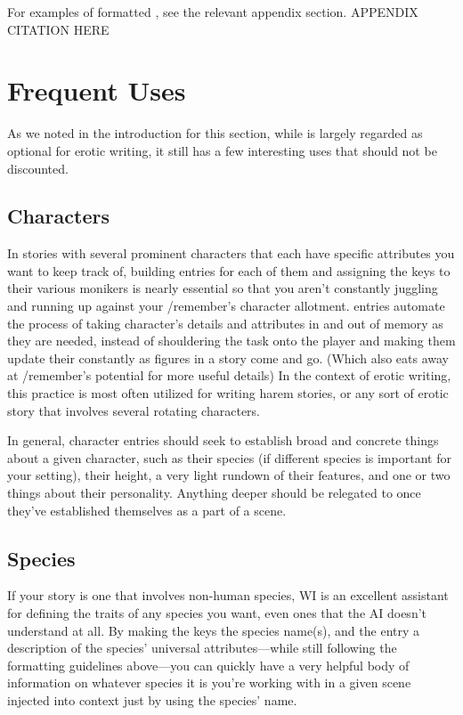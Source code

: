 ﻿\documentclass[Coomer-main.tex]{subfiles}
\begin{document}
For examples of formatted \wi, see the relevant appendix section. APPENDIX CITATION HERE

\section{Frequent Uses}

As we noted in the introduction for this section, while \wi is largely regarded as optional for erotic writing, it still has a few interesting uses that should not be discounted.

\subsection{Characters}

In stories with several prominent characters that each have specific attributes you want to keep track of, building \wi entries for each of them and assigning the keys to their various monikers is nearly essential so that you aren’t constantly juggling and running up against your /remember’s character allotment. \wi entries automate the process of taking character’s details and attributes in and out of memory as they are needed, instead of shouldering the task onto the player and making them update their \rem constantly as figures in a story come and go. (Which also eats away at /remember’s potential for more useful details) In the context of erotic writing, this practice is most often utilized for writing harem stories, or any sort of erotic story that involves several rotating characters.

In general, character entries should seek to establish broad and concrete things about a given character, such as their species (if different species is important for your setting), their height, a very light rundown of their features, and one or two things about their personality.
Anything deeper should be relegated to \rem once they've established themselves as a part of a scene.

\subsection{Species}

If your story is one that involves non-human species, WI is an excellent assistant for defining the traits of any species you want, even ones that the AI doesn't understand at all.
By making the keys the species name(s), and the entry a description of the species' universal attributes—while still following the formatting guidelines above—you can quickly have a very helpful body of information on whatever species it is you're working with in a given scene injected into context just by using the species' name.
\end{document}
